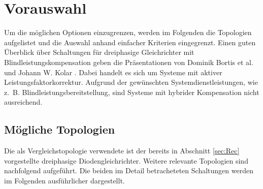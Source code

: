 \chapter{Vorauswahl}
Um die möglichen Optionen einzugrenzen, werden im Folgenden die Topologien aufgelistet und die Auswahl anhand einfacher Kriterien eingegrenzt. Einen guten Überblick über Schaltungen für dreiphasige Gleichrichter mit Blindleistungskompensation geben die Präsentationen von Dominik Bortis et al. \cite{Advanced3PhPFC} und Johann W. Kolar \cite{Essenceof3pKolar}. Dabei handelt es sich um Systeme mit aktiver Leistungsfaktorkorrektur. Aufgrund der gewünschten Systemdienstleistungen, wie z.~B. Blindleistungsbereitstellung, sind Systeme mit hybrider Kompensation nicht ausreichend.

\section{Mögliche Topologien}
Die als Vergleichstopologie verwendete ist der bereits in Abschnitt \ref{sec:Rec} vorgestellte dreiphasige Diodengleichrichter. Weitere relevante Topologien sind nachfolgend aufgeführt. Die beiden im Detail betracheteten Schaltungen werden im Folgenden ausführlicher dargestellt.
